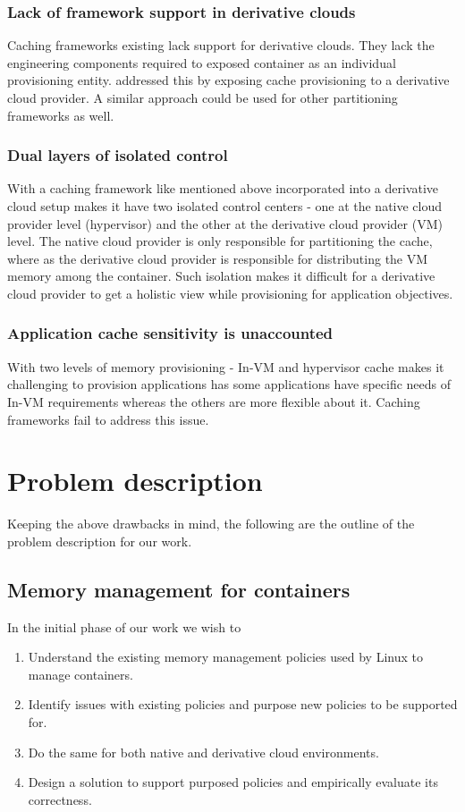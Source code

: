       \subsubsection{Lack of framework support in derivative clouds}
	Caching frameworks existing lack support for derivative clouds. They lack the engineering components required to 
	exposed container as an individual provisioning entity. \dd{} addressed this by exposing cache provisioning to a
	derivative cloud provider. A similar approach could be used for other partitioning frameworks as well.
      
      \subsubsection{Dual layers of isolated control}
	With a caching framework like mentioned above incorporated into a derivative cloud setup makes it have two isolated
	control centers - one at the native cloud provider level (hypervisor) and the other at the derivative 
	cloud provider (VM) level. The native cloud provider is only responsible for partitioning the cache, where as the 
	derivative cloud provider is responsible for distributing the VM memory among the container. Such isolation makes
	it difficult for a derivative cloud provider to get a holistic view while provisioning for application objectives. 
	
      \subsubsection{Application cache sensitivity is unaccounted}
	With two levels of memory provisioning - In-VM and hypervisor cache makes it challenging to provision applications 
	has some applications have specific needs of In-VM requirements whereas the others are more flexible about it. 
	Caching frameworks fail to address this issue.
    
  \section{Problem description}  
    Keeping the above drawbacks in mind, the following are the outline of the problem description for our work. 
  
   \subsection{Memory management for containers}
      In the initial phase of our work we wish to 
      \begin{enumerate}
	\item Understand the existing memory management policies used by Linux to manage containers.
	\item Identify issues with existing policies and purpose new policies to be supported for.
	\item Do the same for both native and derivative cloud environments. 
	\item Design a solution to support purposed policies and empirically evaluate its correctness.
      \end{enumerate}

